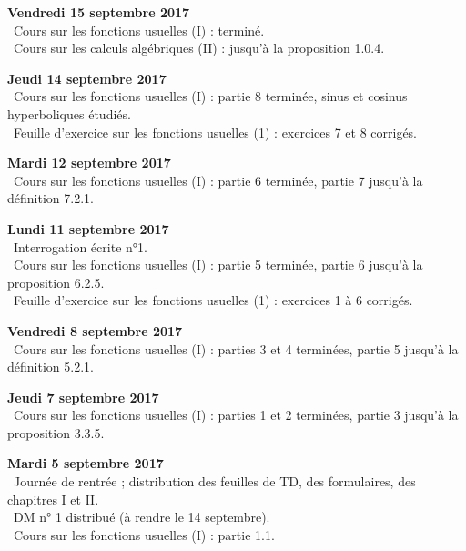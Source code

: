 \documentclass[12pt,a4paper]{article}
\begin{document}
\noindent\textbf{Vendredi 15 septembre 2017}\\
\bu\ Cours sur les fonctions usuelles (I) : terminé. \\
\bu\ Cours sur les calculs algébriques (II) : jusqu'à la proposition 1.0.4. \\
\vspace{.4cm}

\noindent\textbf{Jeudi 14 septembre 2017}\\
\bu\ Cours sur les fonctions usuelles (I) : partie 8 terminée, sinus et cosinus hyperboliques étudiés. \\
\bu\ Feuille d'exercice sur les fonctions usuelles (1) : exercices 7 et 8 corrigés. \\
\vspace{.4cm}

\noindent\textbf{Mardi 12 septembre 2017}\\
\bu\ Cours sur les fonctions usuelles (I) : partie 6 terminée, partie 7 jusqu'à la définition 7.2.1. \\
\vspace{.4cm}

\noindent\textbf{Lundi 11 septembre 2017}\\
\bu\ Interrogation écrite n°1. \\
\bu\ Cours sur les fonctions usuelles (I) : partie 5 terminée, partie 6 jusqu'à la proposition 6.2.5. \\
\bu\ Feuille d'exercice sur les fonctions usuelles (1) : exercices 1 à 6 corrigés. \\
\vspace{.4cm}

\noindent\textbf{Vendredi 8 septembre 2017}\\
\bu\ Cours sur les fonctions usuelles (I) : parties 3 et 4 terminées, partie 5 jusqu'à la définition 5.2.1. \\
\vspace{.4cm}

\noindent\textbf{Jeudi 7 septembre 2017}\\
\bu\ Cours sur les fonctions usuelles (I) : parties 1 et 2 terminées, partie 3 jusqu'à la proposition 3.3.5. \\
\vspace{.4cm}

\noindent\textbf{Mardi 5 septembre 2017}\\
\bu\ Journée de rentrée ; distribution des feuilles de TD, des formulaires, des
chapitres I et II.  \\
\bu\ DM n° 1 distribué (à rendre le 14 septembre). \\
\bu\ Cours sur les fonctions usuelles (I) : partie 1.1. \\
\vspace{.4cm}


\label{end}
\end{document}
